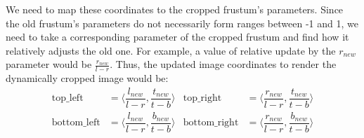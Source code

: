 We need to map these coordinates to the cropped frustum's parameters. Since the old frustum's parameters do not necessarily form ranges between -1 and 1, we need to take a corresponding parameter of the cropped frustum and find how it relatively adjusts the old one. For example, a value of relative update by the $r_{new}$ parameter would be $\tfrac{r_{new}}{l - r}$. Thus, the updated image coordinates to render the dynamically cropped image would be:
\begin{align}
	\text{top{\_}left} &= \langle \dfrac{l_{new}}{l - r}, \dfrac{t_{new}}{t - b} \rangle & \text{top{\_}right} &= \langle \dfrac{r_{new}}{l - r}, \dfrac{t_{new}}{t - b} \rangle \\
	\text{bottom{\_}left} &= \langle \dfrac{l_{new}}{l - r}, \dfrac{b_{new}}{t - b} \rangle & \text{bottom{\_}right} &= \langle \dfrac{r_{new}}{l - r}, \dfrac{b_{new}}{t - b} \rangle
\end{align}



